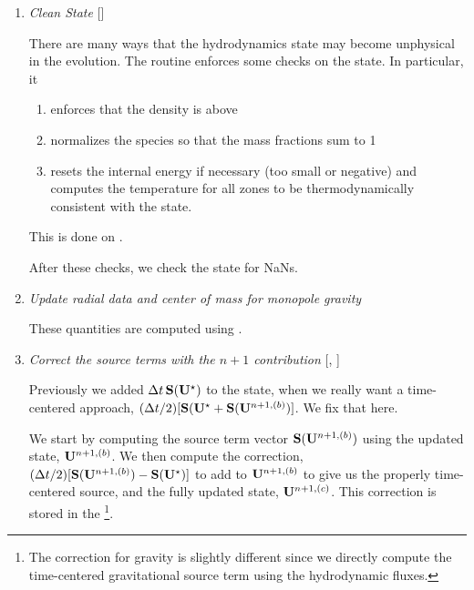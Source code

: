 \begin{enumerate}
\begin{enumerate}
  \item method of lines

  \end{enumerate}

\item \label{strang:clean} {\em Clean State} []


  There are many ways that the hydrodynamics state may become
  unphysical in the evolution.  The  routine
  enforces some checks on the state.  In particular, it
  \begin{enumerate}
  \item enforces that the density is above 
  \item normalizes the species so that the mass fractions sum to 1
  \item resets the internal energy if necessary (too small or negative)
    and computes the temperature for all zones to be thermodynamically 
    consistent with the state.
  \end{enumerate}
  This is done on .

  After these checks, we check the state for NaNs.

\item \label{strang:radial} {\em Update radial data and center of mass for monopole gravity}

 These quantities are computed using .



\item \label{strang:newsource} {\em Correct the source terms with the $n+1$ contribution}
  [, ]

  Previously we added $\Delta t\, {\bf S}({\bf U}^\star)$ to the state, when
  we really want a time-centered approach, $(\Delta t/2)[{\bf S}({\bf U}^\star
    + {\bf S}({\bf U}^{n+1,(b)})]$.  We fix that here.

  We start by computing the source term vector ${\bf S}({\bf U}^{n+1,(b)})$
  using the updated state, ${\bf U}^{n+1,(b)}$.  We then compute the
  correction, $(\Delta t/2)[{\bf S}({\bf U}^{n+1,(b)}) - {\bf S}({\bf U}^\star)]$ to
  add to ${\bf U}^{n+1,(b)}$ to give us the properly time-centered source,
  and the fully updated state, ${\bf U}^{n+1,(c)}$.  This correction is stored
  in the  \multifab\footnote{The correction for gravity is slightly different since we directly compute the time-centered gravitational source term using the hydrodynamic fluxes.}.



\end{enumerate}
